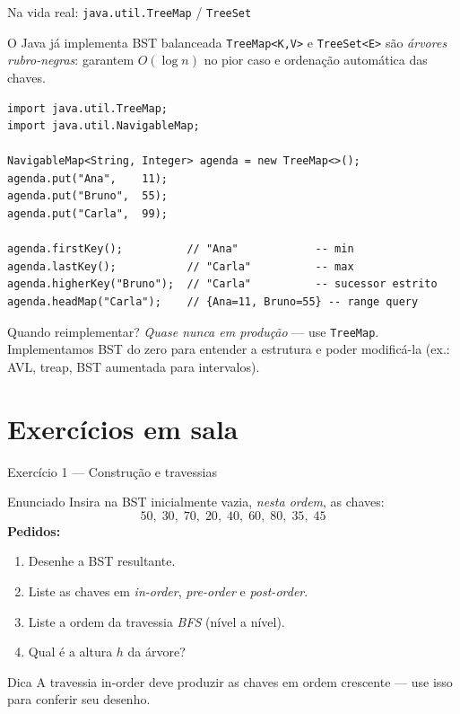 \documentclass[aspectratio=169]{beamer}
\begin{document}
\begin{frame}[fragile,shrink=10]{Na vida real: \texttt{java.util.TreeMap} / \texttt{TreeSet}}
\begin{block}{O Java já implementa BST balanceada}
\texttt{TreeMap<K,V>} e \texttt{TreeSet<E>} são \emph{árvores rubro-negras}: garantem $O(\log n)$ no pior caso e ordenação automática das chaves.
\end{block}
\begin{lstlisting}
import java.util.TreeMap;
import java.util.NavigableMap;

NavigableMap<String, Integer> agenda = new TreeMap<>();
agenda.put("Ana",    11);
agenda.put("Bruno",  55);
agenda.put("Carla",  99);

agenda.firstKey();          // "Ana"            -- min
agenda.lastKey();           // "Carla"          -- max
agenda.higherKey("Bruno");  // "Carla"          -- sucessor estrito
agenda.headMap("Carla");    // {Ana=11, Bruno=55} -- range query
\end{lstlisting}
\begin{exampleblock}{Quando reimplementar?}
\emph{Quase nunca em produção} --- use \texttt{TreeMap}. Implementamos BST do zero para \alert{entender} a estrutura e poder modificá-la (ex.: AVL, treap, BST aumentada para intervalos).
\end{exampleblock}
\end{frame}

\section{Exercícios em sala}

\begin{frame}[shrink=20]{Exercício 1 --- Construção e travessias}
\begin{block}{Enunciado}
Insira na BST inicialmente vazia, \emph{nesta ordem}, as chaves:
\[
50,\; 30,\; 70,\; 20,\; 40,\; 60,\; 80,\; 35,\; 45
\]
\textbf{Pedidos:}
\begin{enumerate}
  \item Desenhe a BST resultante.
  \item Liste as chaves em \emph{in-order}, \emph{pre-order} e \emph{post-order}.
  \item Liste a ordem da travessia \emph{BFS} (nível a nível).
  \item Qual é a altura $h$ da árvore?
\end{enumerate}
\end{block}
\begin{exampleblock}{Dica}
A travessia in-order deve produzir as chaves em ordem crescente --- use isso para conferir seu desenho.
\end{exampleblock}
\end{frame}
\end{document}
